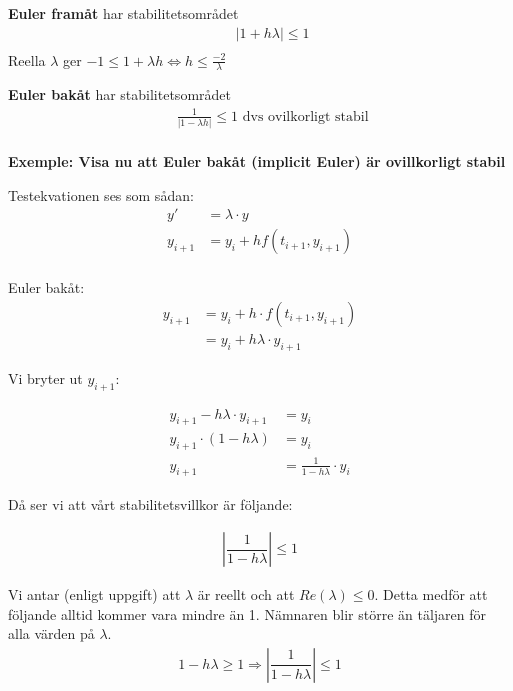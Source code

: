 \begin{multicols}{2}
\textbf{Euler framåt} har stabilitetsområdet
\begin{align*}
  &\quad  |1+h\lambda|\leq1 \\
\end{align*}
Reella $\lambda$ ger $-1\leq1+\lambda h \Leftrightarrow h\leq\frac{-2}{\lambda}$

\textbf{Euler bakåt} har stabilitetsområdet
\begin{align*}
  &\quad  \frac{1}{|1-\lambda h|} \leq 1 \text{  dvs ovilkorligt stabil} \\
\end{align*}

\textbf{Exemple: Visa nu att Euler bakåt (implicit Euler) är ovillkorligt stabil} \newline

Testekvationen ses som sådan:
\begin{align*}
     y' &= \lambda\cdot y\\
y_{i+1} &= y_i + hf(t_{i+1}, y_{i+1}) \\
\end{align*}

Euler bakåt:
\begin{align*}
y_{i+1} &= y_i + h\cdot f(t_{i+1}, y_{i+1}) \\
	&= y_i + h\lambda \cdot y_{i+1}
\end{align*}

Vi bryter ut $y_{i+1}$:

\begin{align*}
y_{i+1} - h\lambda \cdot y_{i+1} &= y_i \\
y_{i+1} \cdot (1 - h\lambda) &= y_i \\
y_{i+1} &= \frac{1}{1 - h\lambda} \cdot y_i
\end{align*}

Då ser vi att vårt stabilitetsvillkor är följande:

\begin{align*}
\left| \dfrac{1}{1-h\lambda} \right| \le 1
\end{align*}

Vi antar (enligt uppgift) att $\lambda$ är reellt och att $Re(\lambda) \le 0$. Detta medför att följande alltid kommer vara mindre än 1. Nämnaren blir större än täljaren för alla värden på $\lambda$.
\begin{align*}
1 - h\lambda \ge 1 \Rightarrow \left| \dfrac{1}{1-h\lambda} \right| \le 1
\end{align*}


\end{multicols}

